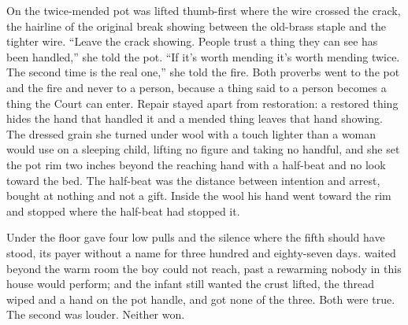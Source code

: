 On  the twice-mended pot was lifted thumb-first where the wire crossed the crack, the hairline of the original break showing between the old-brass staple and the tighter wire. “Leave the crack showing. People trust a thing they can see has been handled,” she told the pot. “If it's worth mending it's worth mending twice. The second time is the real one,” she told the fire. Both proverbs went to the pot and the fire and never to a person, because a thing said to a person becomes a thing the Court can enter. Repair stayed apart from restoration: a restored thing hides the hand that handled it and a mended thing leaves that hand showing. The dressed grain she turned under wool with a touch lighter than a woman would use on a sleeping child, lifting no figure and taking no handful, and she set the pot rim two inches beyond the reaching hand with a half-beat and no look toward the bed. The half-beat was the distance between intention and arrest, bought at nothing and not a gift. Inside the wool his hand went toward the rim and stopped where the half-beat had stopped it.

Under the floor  gave four low pulls and the silence where the fifth should have stood, its payer without a name for three hundred and eighty-seven days.  waited beyond the warm room the boy could not reach, past a rewarming nobody in this house would perform; and the infant still wanted the crust lifted, the thread wiped and a hand on the pot handle, and got none of the three. Both were true. The second was louder. Neither won.

\scenebreak

